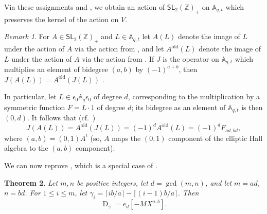 \documentclass[reqno]{amsart}
\theoremstyle{plain}
\newtheorem{theorem}{Theorem}[section]
\theoremstyle{definition}
\theoremstyle{remark}
\newtheorem{remark}[theorem]{Remark}
\DeclareMathOperator{\D}{D}
\newcommand{\A}{\mathbb{A}}%
\newcommand{\<}{\langle}
\renewcommand{\>}{\rangle}
\begin{document}
Via these assignments and , we obtain an action of $\mathsf{SL}_2(\mathbb{Z})_+$ on $\A_{q,t}$ which preserves the kernel of the action on $V$.

\begin{remark}
    \label{rmk:intertwine}
    For $A \in \mathsf{SL}_2(\mathbb{Z})_+$ and $L \in \A_{q,t}$ let $A(L)$ denote the image of $L$ under the action of $A$ via the action from , and let $A^{\text{old}}(L)$ denote the image of $L$ under the action of $A$ via the action from \cite{BergeronGarsiaSergelXin2015CompositionalShuffleConjectures}. If $J$ is the operator on $\A_{q,t}$ which multiplies an element of bidegree $(a,b)$ by $(-1)^{a+b}$, then $J(A(L)) = A^{\text{old}}(J(L))$ \cite[Section~3, p.\ 4143]{Mellit2021Rational}.
    
    In particular, let $L \in \epsilon_0 \A_{q} \epsilon_0$ of degree $d$, corresponding to the multiplication by a symmetric function $F = L \cdot 1$ of degree $d$; its bidegree as an element of $\A_{q,t}$ is then $(0,d)$. It follows that (cf.\ \cite[Conjecture~4.2]{BergeronGarsiaSergelXin2015CompositionalShuffleConjectures})
    \[ J(A(L)) = A^{\text{old}}(J(L)) = (-1)^d A^{\text{old}}(L) = (-1)^d F_{ad,bd}, \]
    where $(a,b) = (0,1) A^t$ (so, $A$ maps the $(0,1)$ component of the elliptic Hall algebra to the $(a,b)$ component).
\end{remark}

We can now reprove \cite[Proposition~3.6.1]{BHMPS2023ShuffleAnyLine}, which is a special case of \cite[Proposition~6.7]{Negut2014ShuffleAlgebra}.

\begin{theorem}
    \label{thm:rational_shuffle}
    Let $m, n$ be positive integers, let $d = \gcd(m,n)$, and let $m = ad$, $n = bd$. For $1 \leq i \leq m$, let $\gamma_i = \lceil ib/a \rceil - \lceil (i-1)b/a \rceil$. Then
    \[ \D_\gamma = e_d \left[ -MX^{a,b} \right]. \] 
\end{theorem}
\end{document}
